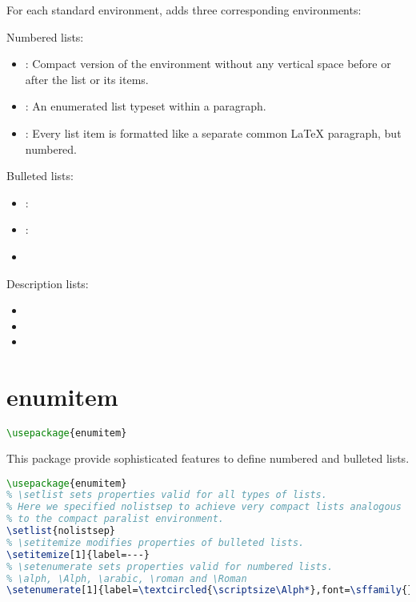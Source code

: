For each standard environment,  adds three corresponding environments:

Numbered lists:
\begin{itemize}
\item {}: Compact version of the  environment without any vertical space before or after the list or its items.
\item {}: An enumerated list typeset within a paragraph.
\item {}: Every list item is formatted like a separate common LaTeX paragraph, but numbered.
\end{itemize}

Bulleted lists:
\begin{itemize}
\item {}:
\item {}:
\item {}
\end{itemize}

Description lists:
\begin{itemize}
\item {}
\item {}
\item {}
\end{itemize}

\section{enumitem}
\label{sec:enumitem}
\begin{lstlisting}[language=TeX]
\usepackage{enumitem}
\end{lstlisting}


This package provide sophisticated features to define numbered and bulleted lists.

\begin{lstlisting}[language=TeX]
\usepackage{enumitem}
% \setlist sets properties valid for all types of lists.
% Here we specified nolistsep to achieve very compact lists analogous
% to the compact paralist environment.
\setlist{nolistsep}
% \setitemize modifies properties of bulleted lists.
\setitemize[1]{label=---}
% \setenumerate sets properties valid for numbered lists.
% \alph, \Alph, \arabic, \roman and \Roman
\setenumerate[1]{label=\textcircled{\scriptsize\Alph*},font=\sffamily{}}
\end{lstlisting}


